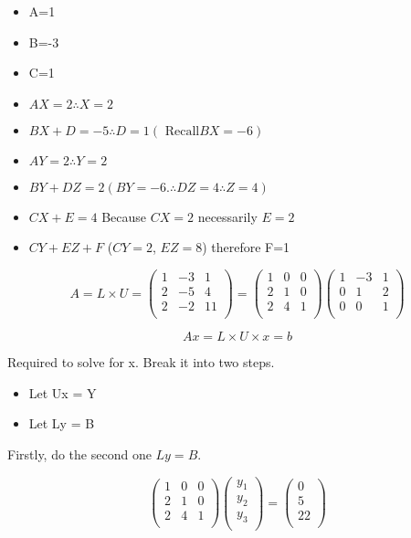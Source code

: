 \documentclass[12pt, a4paper]{report}
\theoremstyle{plain}
\theoremstyle{definition}
\theoremstyle{remark}
\begin{document}
{\begin{itemize}
\item A=1
\item B=-3
\item C=1
\item $AX=2 \therefore X=2$
\item $BX+D=-5 \therefore D=1 ( \mbox{  Recall}BX=-6)$
\item $AY=2 \therefore Y=2$
\item $BY+DZ=2 (BY=-6. \therefore DZ = 4 \therefore Z=4)$
\item $CX+E =4 $ Because $CX=2$ necessarily $E=2$
\item $CY+EZ+F$  ($CY=2$, $EZ= 8$) therefore F=1
\end{itemize}


\[ A = L \times U=\left(\begin{array}{ccc}
1&-3&1\\
2&-5&4\\
2&-2&11\\
\end{array}\right) = \left(\begin{array}{ccc}
1&0&0\\
2&1&0\\
2&4&1\\
\end{array}\right)\left(\begin{array}{ccc}
1&-3&1\\
0&1&2\\
0&0&1\\
\end{array}\right)\]

{\Large
\[ Ax = L \times U \times x = b\]

Required to solve for x. Break it into two steps.
\begin{itemize}
\item Let Ux = Y
\item Let Ly = B
\end{itemize}

Firstly, do the second one $Ly=B$.
 
\[\left(\begin{array}{ccc}
1&0&0\\
2&1&0\\
2&4&1\\
\end{array}\right)
\left( \begin{array}{c}
y_1\\
y_2\\
y_3\\
\end{array}\right)
=\left( \begin{array}{c}
0\\
5\\
22\\
\end{array}\right)
\]

}}
\end{document}
